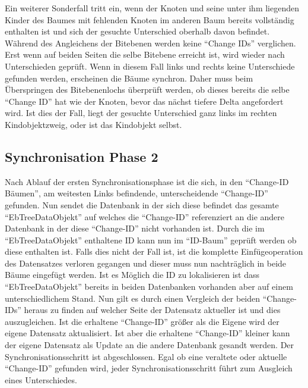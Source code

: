 \documentclass[a4paper,11pt,oneside,%
headsepline,												%
footsepline,												%
bibtotocnumbered									%
]{scrreprt}
\begin{document}
Ein weiterer Sonderfall tritt ein, wenn der Knoten und seine unter ihm liegenden Kinder des Baumes mit fehlenden Knoten im anderen Baum bereits vollständig enthalten ist und sich der gesuchte Unterschied oberhalb davon befindet. Während des Angleichens der Bitebenen werden keine \enquote{Change IDs} verglichen. Erst wenn auf beiden Seiten die selbe Bitebene erreicht ist, wird wieder nach Unterschieden geprüft. Wenn in diesem Fall links und rechts keine Unterschiede gefunden werden, erscheinen die Bäume synchron. Daher muss beim Überspringen des Bitebenenlochs überprüft werden, ob dieses bereits die selbe \enquote{Change ID}  hat wie der Knoten, bevor das nächst tiefere Delta angefordert wird. Ist dies der Fall, liegt der gesuchte Unterschied ganz links im rechten Kindobjektzweig, oder ist das Kindobjekt selbst.

\subsection{Synchronisation Phase 2}
Nach Ablauf der ersten Synchronisationsphase ist die sich, in den \enquote{Change-ID Bäumen}, am weitesten Links befindende, unterscheidende \enquote{Change-ID} gefunden. Nun sendet die Datenbank in der sich diese befindet das gesamte \enquote{EbTreeDataObjekt} auf welches die \enquote{Change-ID} referenziert an die andere Datenbank in der diese \enquote{Change-ID} nicht vorhanden ist. Durch die im \enquote{EbTreeDataObjekt} enthaltene ID kann nun im  \enquote{ID-Baum} geprüft werden ob diese enthalten ist. Falls dies nicht der Fall ist, ist die komplette Einfügeoperation des Datensatzes verloren gegangen und dieser muss nun nachträglich in beide Bäume eingefügt werden. Ist es Möglich die ID zu lokalisieren ist dass \enquote{EbTreeDataObjekt} bereits in beiden Datenbanken vorhanden aber auf einem unterschiedlichem Stand. Nun gilt es durch einen Vergleich der beiden \enquote{Change-IDs} heraus zu finden auf welcher Seite der Datensatz aktueller ist und dies auszugleichen. Ist die erhaltene \enquote{Change-ID} größer als die Eigene wird der eigene Datensatz aktualisiert. Ist aber die erhaltene \enquote{Change-ID} kleiner kann der eigene Datensatz als Update an die andere Datenbank gesandt werden. Der Synchronisationsschritt ist abgeschlossen. Egal ob eine veraltete oder aktuelle  \enquote{Change-ID} gefunden wird, jeder Synchronisationsschritt führt zum Ausgleich eines Unterschiedes.
\end{document}
